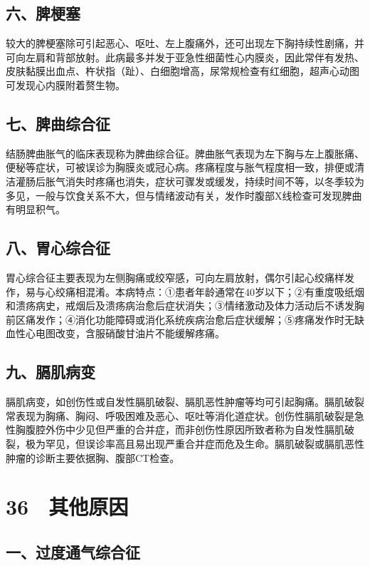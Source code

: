 \subsection{六、脾梗塞}

较大的脾梗塞除可引起恶心、呕吐、左上腹痛外，还可出现左下胸持续性剧痛，并可向左肩和背部放射。此病最多并发于亚急性细菌性心内膜炎，因此常伴有发热、皮肤黏膜出血点、杵状指（趾）、白细胞增高，尿常规检查有红细胞，超声心动图可发现心内膜附着赘生物。

\subsection{七、脾曲综合征}

结肠脾曲胀气的临床表现称为脾曲综合征。脾曲胀气表现为左下胸与左上腹胀痛、便秘等症状，可被误诊为胸膜炎或冠心病。疼痛程度与胀气程度相一致，排便或清洁灌肠后胀气消失时疼痛也消失，症状可骤发或缓发，持续时间不等，以冬季较为多见，一般与饮食关系不大，但与情绪波动有关，发作时腹部X线检查可发现脾曲有明显积气。

\subsection{八、胃心综合征}

胃心综合征主要表现为左侧胸痛或绞窄感，可向左肩放射，偶尔引起心绞痛样发作，易与心绞痛相混淆。本病特点：①患者年龄通常在40岁以下；②有重度吸纸烟和溃疡病史，戒烟后及溃疡病治愈后症状消失；③情绪激动及体力活动后不诱发胸前区痛发作；④消化功能障碍或消化系统疾病治愈后症状缓解；⑤疼痛发作时无缺血性心电图改变，含服硝酸甘油片不能缓解疼痛。

\subsection{九、膈肌病变}

膈肌病变，如创伤性或自发性膈肌破裂、膈肌恶性肿瘤等均可引起胸痛。膈肌破裂常表现为胸痛、胸闷、呼吸困难及恶心、呕吐等消化道症状。创伤性膈肌破裂是急性胸腹腔外伤中少见但严重的合并症，而非创伤性原因所致者称为自发性膈肌破裂，极为罕见，但误诊率高且易出现严重合并症而危及生命。膈肌破裂或膈肌恶性肿瘤的诊断主要依据胸、腹部CT检查。

\protect\hypertarget{text00101.html}{}{}

\section{36　其他原因}

\subsection{一、过度通气综合征}

